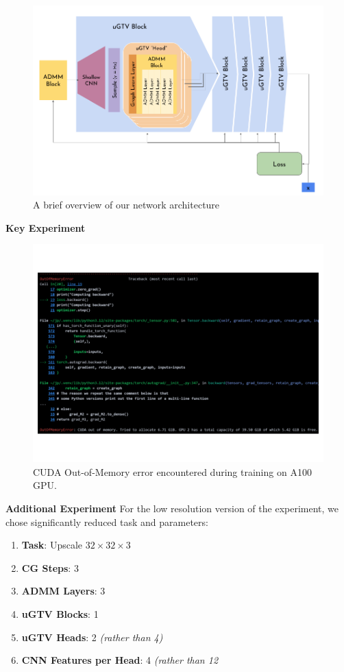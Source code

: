 \documentclass{article}
\theoremstyle{plain}
\theoremstyle{definition}
\theoremstyle{remark}
\begin{document}
\begin{figure}[H]
    \centering
    \includegraphics[width=0.80\linewidth]{Method Diagram (1).png}
    \vskip -0.2in
    \caption{A brief overview of our network architecture}
    \label{fig:network-diagram}
\end{figure}

\textbf{Key Experiment}
\begin{figure}[H]
    \centering
    \includegraphics[width=0.75\linewidth]{Method Diagram (2).png}
    \vskip -0.2in
    \caption{CUDA Out-of-Memory error encountered during training on A100 GPU.}
    \label{fig:oom-error}
\end{figure}

\textbf{Additional Experiment}
For the low resolution version of the experiment, we chose significantly reduced task and parameters:
\begin{enumerate}
    \item \textbf{Task}: Upscale $32\times 32\times 3$
    \item \textbf{CG Steps}: 3
    \item \textbf{ADMM Layers}: 3
    \item \textbf{uGTV Blocks}: 1
    \item \textbf{uGTV Heads}: 2 \textit{(rather than 4)}
    \item \textbf{CNN Features per Head}: 4 \textit{(rather than 12}
\end{enumerate}

\end{document}
